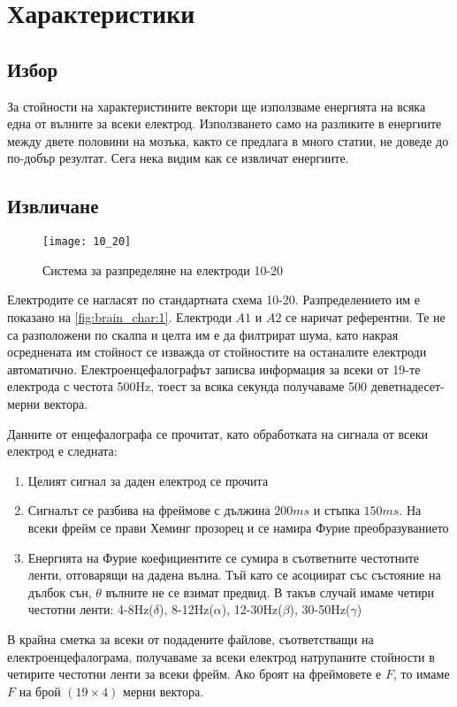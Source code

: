 \documentclass[main.tex]{subfiles}
\begin{document}
\section{Характеристики}
\subsection{Избор}
За стойности на характеристините вектори ще използваме енергията на всяка една от вълните за всеки електрод. Използването само на разликите в енергиите между двете половини на мозъка, както се предлага в много статии, не доведе до по-добър резултат. Сега нека видим как се извличат енергиите.

\subsection{Извличане}

\begin{minipage}{0.45\textwidth}
        \begin{figure}[H]
                \texttt{[image: 10\_20]}
                \caption{Система за разпределяне на електроди 10-20}
                \label{fig:brain_char:1}
        \end{figure}
\end{minipage} \hfill
\begin{minipage}{0.45\textwidth}
        Електродите се нагласят по стандартната схема 10-20. Разпределението им е показано на \autoref{fig:brain_char:1}. Електроди $A1$ и $A2$ се наричат референтни. Те не са разположени по скалпа и целта им е да филтрират шума, като накрая осреднената им стойност се изважда от стойностите на останалите електроди автоматично. Електроенцефалографът записва информация за всеки от 19-те електрода с честота 500Hz, тоест за всяка секунда получаваме 500 деветнадесет-мерни вектора.
\end{minipage}
Данните от енцефалографа се прочитат, като обработката на сигнала от всеки електрод е следната:
\begin{enumerate}
        \item Целият сигнал за даден електрод се прочита
        \item Сигналът се разбива на фреймове с дължина $200ms$ и стъпка $150ms$. На всеки фрейм се прави Хеминг прозорец и се намира Фурие преобразуванието
        \item Енергията на Фурие коефициентите се сумира в съответните честотните ленти, отговарящи на дадена вълна. Тъй като се асоциират със състояние на дълбок сън, $\theta$ вълните не се взимат предвид. В такъв случай имаме четири честотни ленти: 4-8Hz($\delta$), 8-12Hz($\alpha$), 12-30Hz($\beta$), 30-50Hz($\gamma$)
\end{enumerate}
В крайна сметка за всеки от подадените файлове, съответстващи на електроенцефалограма, получаваме за всеки електрод натрупаните стойности в четирите честотни ленти за всеки фрейм. Ако броят на фреймовете е $F$, то имаме $F$ на брой $(19\times4)$ мерни вектора.
\end{document}
